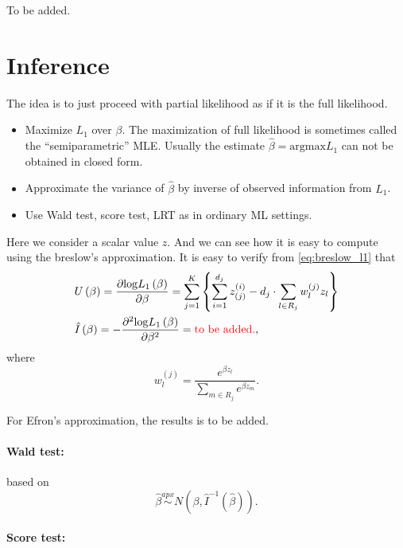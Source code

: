 \documentclass[a4paper,12pt]{article}
\begin{document}
{\color{red} To be added.}

\section{Inference}
\label{sec:inference}

The idea is to just proceed with partial likelihood as if it is the full likelihood.
\begin{itemize}
\item Maximize $L_1$ over $\beta$. The maximization of full likelihood is sometimes called the ``semiparametric'' MLE. Usually the estimate $\hat{\beta} = \mathrm{argmax}L_1$ can not be obtained in closed form.
\item Approximate the variance of $\hat{\beta}$ by inverse of observed information from $L_1$.
\item Use Wald test, score test, LRT as in ordinary ML settings.
\end{itemize}


Here we consider a scalar value $z$. And we can see how it is easy to compute using the breslow's approximation. It is easy to verify from \eqref{eq:breslow_l1} that
\[
  \begin{aligned}
    & U\left(\beta\right) =
  \frac{\partial \mathrm{log}L_1\left(\beta\right)}{\partial \beta}
  = \sum\limits_{j = 1}^K\left\{
    \sum\limits_{i = 1}^{d_j}z_{\left(j\right)}^{\left(i\right)}
    - d_j
    \cdot
    \sum\limits_{l \in R_j}w_l^{\left(j\right)}z_l
  \right\}    \\
  & \hat{I}\left(\beta\right)
  = -\frac{\partial^2\mathrm{log}L_1\left(\beta\right)}{\partial \beta^2}
  = {\color{red}\text{to be added.}}
  ,
  \end{aligned}
\]
where
\[
  w_l^{\left(j\right)} = \frac{
    e^{\beta z_l}
  }{
    \sum\limits_{m\in R_j}e^{\beta z_m}
  }
  .
\]

For Efron's approximation, the results is {\color{red}to be added.}

\paragraph{Wald test:}

based on
\[
  \hat{\beta} \overset{apx}{\sim}
  N\left(\beta, \hat{I}^{-1}\left(\hat{\beta}\right)\right)
  .
\]

\paragraph{Score test:}
\end{document}
